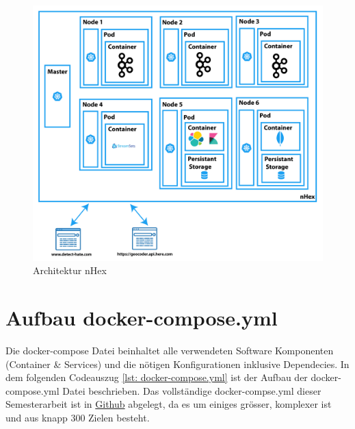 \begin{figure}[H]
	\centering
		\includegraphics[scale=0.4 ]{images/architecktur_high_level_nhex-02-02.png}
	\caption{Architektur nHex}
	\label{fig:architecture_nhex}
\end{figure}

\section{Aufbau docker-compose.yml }
\label{sec:docker_compose}

Die docker-compose Datei beinhaltet alle verwendeten Software Komponenten (Container \& Services) und die n{\"o}tigen Konfigurationen inklusive Dependecies. In dem folgenden Codeauszug \ref{lst: docker-compose.yml} ist der Aufbau der docker-compose.yml Datei beschrieben. Das vollst{\"a}ndige docker-compse.yml dieser Semesterarbeit ist in \href{https://github.com/verenamai/bgd_term}{Github} abgelegt, da es um einiges gr{\"o}sser, komplexer ist und aus knapp 300 Zielen besteht.
  
